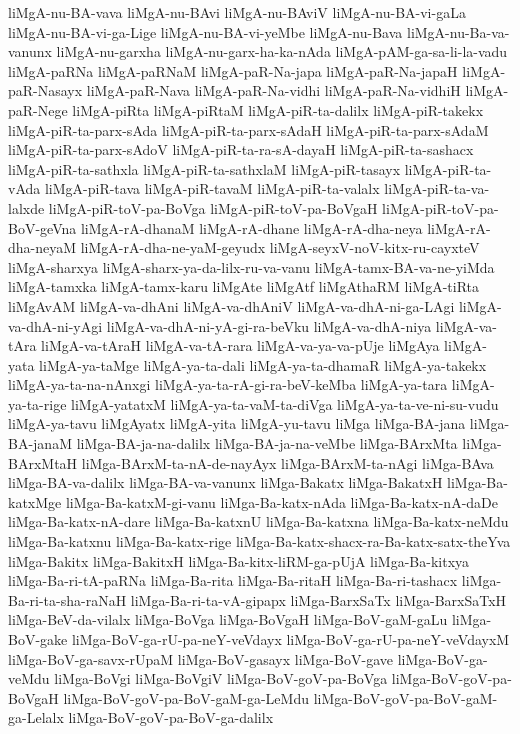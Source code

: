 {liMgA-nu-BA-vava
liMgA-nu-BAvi
liMgA-nu-BAviV
liMgA-nu-BA-vi-gaLa
liMgA-nu-BA-vi-ga-Lige
liMgA-nu-BA-vi-yeMbe
liMgA-nu-Bava
liMgA-nu-Ba-va-vanunx
liMgA-nu-garxha
liMgA-nu-garx-ha-ka-nAda
liMgA-pAM-ga-sa-li-la-vadu
liMgA-paRNa
liMgA-paRNaM
liMgA-paR-Na-japa
liMgA-paR-Na-japaH
liMgA-paR-Nasayx
liMgA-paR-Nava
liMgA-paR-Na-vidhi
liMgA-paR-Na-vidhiH
liMgA-paR-Nege
liMgA-piRta
liMgA-piRtaM
liMgA-piR-ta-dalilx
liMgA-piR-takekx
liMgA-piR-ta-parx-sAda
liMgA-piR-ta-parx-sAdaH
liMgA-piR-ta-parx-sAdaM
liMgA-piR-ta-parx-sAdoV
liMgA-piR-ta-ra-sA-dayaH
liMgA-piR-ta-sashacx
liMgA-piR-ta-sathxla
liMgA-piR-ta-sathxlaM
liMgA-piR-tasayx
liMgA-piR-ta-vAda
liMgA-piR-tava
liMgA-piR-tavaM
liMgA-piR-ta-valalx
liMgA-piR-ta-va-lalxde
liMgA-piR-toV-pa-BoVga
liMgA-piR-toV-pa-BoVgaH
liMgA-piR-toV-pa-BoV-geVna
liMgA-rA-dhanaM
liMgA-rA-dhane
liMgA-rA-dha-neya
liMgA-rA-dha-neyaM
liMgA-rA-dha-ne-yaM-geyudx
liMgA-seyxV-noV-kitx-ru-cayxteV
liMgA-sharxya
liMgA-sharx-ya-da-lilx-ru-va-vanu
liMgA-tamx-BA-va-ne-yiMda
liMgA-tamxka
liMgA-tamx-karu
liMgAte
liMgAtf
liMgAthaRM
liMgA-tiRta
liMgAvAM
liMgA-va-dhAni
liMgA-va-dhAniV
liMgA-va-dhA-ni-ga-LAgi
liMgA-va-dhA-ni-yAgi
liMgA-va-dhA-ni-yA-gi-ra-beVku
liMgA-va-dhA-niya
liMgA-va-tAra
liMgA-va-tAraH
liMgA-va-tA-rara
liMgA-va-ya-va-pUje
liMgAya
liMgA-yata
liMgA-ya-taMge
liMgA-ya-ta-dali
liMgA-ya-ta-dhamaR
liMgA-ya-takekx
liMgA-ya-ta-na-nAnxgi
liMgA-ya-ta-rA-gi-ra-beV-keMba
liMgA-ya-tara
liMgA-ya-ta-rige
liMgA-yatatxM
liMgA-ya-ta-vaM-ta-diVga
liMgA-ya-ta-ve-ni-su-vudu
liMgA-ya-tavu
liMgAyatx
liMgA-yita
liMgA-yu-tavu
liMga
liMga-BA-jana
liMga-BA-janaM
liMga-BA-ja-na-dalilx
liMga-BA-ja-na-veMbe
liMga-BArxMta
liMga-BArxMtaH
liMga-BArxM-ta-nA-de-nayAyx
liMga-BArxM-ta-nAgi
liMga-BAva
liMga-BA-va-dalilx
liMga-BA-va-vanunx
liMga-Bakatx
liMga-BakatxH
liMga-Ba-katxMge
liMga-Ba-katxM-gi-vanu
liMga-Ba-katx-nAda
liMga-Ba-katx-nA-daDe
liMga-Ba-katx-nA-dare
liMga-Ba-katxnU
liMga-Ba-katxna
liMga-Ba-katx-neMdu
liMga-Ba-katxnu
liMga-Ba-katx-rige
liMga-Ba-katx-shacx-ra-Ba-katx-satx-theYva
liMga-Bakitx
liMga-BakitxH
liMga-Ba-kitx-liRM-ga-pUjA
liMga-Ba-kitxya
liMga-Ba-ri-tA-paRNa
liMga-Ba-rita
liMga-Ba-ritaH
liMga-Ba-ri-tashacx
liMga-Ba-ri-ta-sha-raNaH
liMga-Ba-ri-ta-vA-gipapx
liMga-BarxSaTx
liMga-BarxSaTxH
liMga-BeV-da-vilalx
liMga-BoVga
liMga-BoVgaH
liMga-BoV-gaM-gaLu
liMga-BoV-gake
liMga-BoV-ga-rU-pa-neY-veVdayx
liMga-BoV-ga-rU-pa-neY-veVdayxM
liMga-BoV-ga-savx-rUpaM
liMga-BoV-gasayx
liMga-BoV-gave
liMga-BoV-ga-veMdu
liMga-BoVgi
liMga-BoVgiV
liMga-BoV-goV-pa-BoVga
liMga-BoV-goV-pa-BoVgaH
liMga-BoV-goV-pa-BoV-gaM-ga-LeMdu
liMga-BoV-goV-pa-BoV-gaM-ga-Lelalx
liMga-BoV-goV-pa-BoV-ga-dalilx
}
